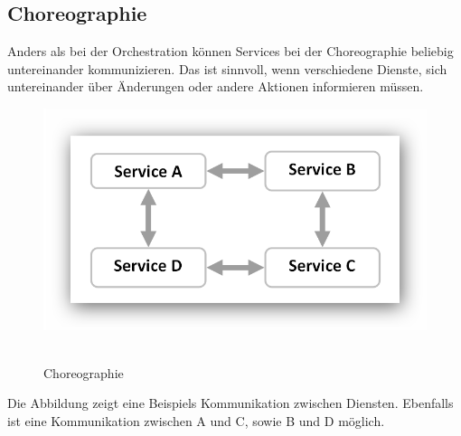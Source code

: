 \subsection*{Choreographie}
\label{subsec:choreographie}
Anders als bei der Orchestration können Services bei der Choreographie beliebig untereinander kommunizieren. Das ist sinnvoll, wenn verschiedene Dienste, sich untereinander über Änderungen oder andere Aktionen informieren müssen.
\newpage
\begin{figure}[htb]
    \centering 
    \includegraphics[width=\linewidth]{content/images/ServiceChoreography}\
    \caption[Choreographie]{Choreographie}
    \label{fig:ServiceChoreography}  
\end{figure}
Die Abbildung zeigt eine Beispiels Kommunikation zwischen Diensten. Ebenfalls ist eine Kommunikation zwischen A und C, sowie B und D möglich. 

